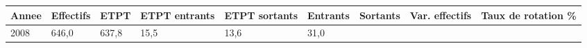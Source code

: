 \begin{longtable}[]{@{}lllllllll@{}}
\toprule
\begin{minipage}[b]{0.05\columnwidth}\raggedright
Annee\strut
\end{minipage} & \begin{minipage}[b]{0.08\columnwidth}\raggedright
Effectifs\strut
\end{minipage} & \begin{minipage}[b]{0.05\columnwidth}\raggedright
ETPT\strut
\end{minipage} & \begin{minipage}[b]{0.10\columnwidth}\raggedright
ETPT entrants\strut
\end{minipage} & \begin{minipage}[b]{0.10\columnwidth}\raggedright
ETPT sortants\strut
\end{minipage} & \begin{minipage}[b]{0.07\columnwidth}\raggedright
Entrants\strut
\end{minipage} & \begin{minipage}[b]{0.07\columnwidth}\raggedright
Sortants\strut
\end{minipage} & \begin{minipage}[b]{0.11\columnwidth}\raggedright
Var. effectifs\strut
\end{minipage} & \begin{minipage}[b]{0.14\columnwidth}\raggedright
Taux de rotation \%\strut
\end{minipage}\tabularnewline
\midrule
\endhead
\begin{minipage}[t]{0.05\columnwidth}\raggedright
2008\strut
\end{minipage} & \begin{minipage}[t]{0.08\columnwidth}\raggedright
646,0\strut
\end{minipage} & \begin{minipage}[t]{0.05\columnwidth}\raggedright
637,8\strut
\end{minipage} & \begin{minipage}[t]{0.10\columnwidth}\raggedright
15,5\strut
\end{minipage} & \begin{minipage}[t]{0.10\columnwidth}\raggedright
13,6\strut
\end{minipage} & \begin{minipage}[t]{0.07\columnwidth}\raggedright
31,0\strut
\end{minipage} & \begin{minipage}[t]{0.07\columnwidth}\raggedright

\end{minipage}
\end{longtable}
